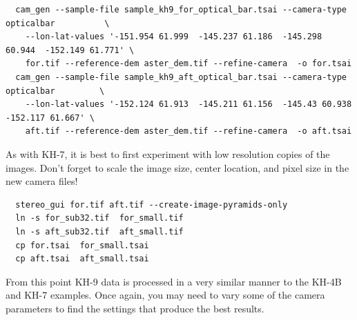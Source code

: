 \begin{verbatim}
  cam_gen --sample-file sample_kh9_for_optical_bar.tsai --camera-type opticalbar          \
    --lon-lat-values '-151.954 61.999  -145.237 61.186  -145.298 60.944  -152.149 61.771' \
    for.tif --reference-dem aster_dem.tif --refine-camera  -o for.tsai
  cam_gen --sample-file sample_kh9_aft_optical_bar.tsai --camera-type opticalbar         \
    --lon-lat-values '-152.124 61.913  -145.211 61.156  -145.43 60.938  -152.117 61.667' \
    aft.tif --reference-dem aster_dem.tif --refine-camera  -o aft.tsai
\end{verbatim}

As with KH-7, it is best to first experiment with low resolution copies of the images.
Don't forget to scale the image size, center location, and pixel size in the new camera files!

\begin{verbatim}
  stereo_gui for.tif aft.tif --create-image-pyramids-only
  ln -s for_sub32.tif  for_small.tif
  ln -s aft_sub32.tif  aft_small.tif
  cp for.tsai  for_small.tsai
  cp aft.tsai  aft_small.tsai
\end{verbatim}

From this point KH-9 data is processed in a very similar manner to the KH-4B and KH-7 examples.
Once again, you may need to vary some of the camera parameters to find the settings that
produce the best results.
